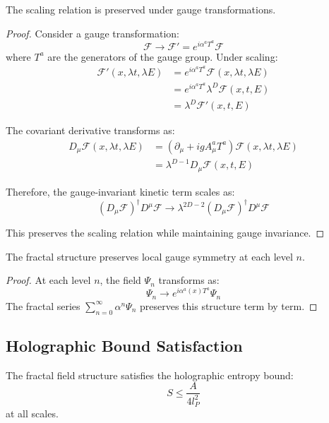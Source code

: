 \documentclass{article}
\begin{document}
\begin{theorem}
The scaling relation is preserved under gauge transformations.
\end{theorem}

\begin{proof}
Consider a gauge transformation:
\[
\mathcal{F} \to \mathcal{F}' = e^{i\alpha^a T^a} \mathcal{F}
\]
where $T^a$ are the generators of the gauge group. Under scaling:
\begin{align*}
\mathcal{F}'(x, \lambda t, \lambda E) &= e^{i\alpha^a T^a} \mathcal{F}(x, \lambda t, \lambda E) \\
&= e^{i\alpha^a T^a} \lambda^D \mathcal{F}(x, t, E) \\
&= \lambda^D \mathcal{F}'(x, t, E)
\end{align*}

The covariant derivative transforms as:
\begin{align*}
D_\mu \mathcal{F}(x, \lambda t, \lambda E) &= (\partial_\mu + igA_\mu^a T^a)\mathcal{F}(x, \lambda t, \lambda E) \\
&= \lambda^{D-1} D_\mu \mathcal{F}(x, t, E)
\end{align*}

Therefore, the gauge-invariant kinetic term scales as:
\[
(D_\mu \mathcal{F})^\dagger D^\mu \mathcal{F} \to \lambda^{2D-2} (D_\mu \mathcal{F})^\dagger D^\mu \mathcal{F}
\]

This preserves the scaling relation while maintaining gauge invariance.
\end{proof}

\begin{corollary}
The fractal structure preserves local gauge symmetry at each level $n$.
\end{corollary}

\begin{proof}
At each level $n$, the field $\Psi_n$ transforms as:
\[
\Psi_n \to e^{i\alpha^a(x) T^a} \Psi_n
\]
The fractal series $\sum_{n=0}^{\infty} \alpha^n \Psi_n$ preserves this structure term by term.
\end{proof}

\subsection{Holographic Bound Satisfaction}

\begin{theorem}
The fractal field structure satisfies the holographic entropy bound:
\[
S \leq \frac{A}{4l_P^2}
\]
at all scales.
\end{theorem}
\end{document}
